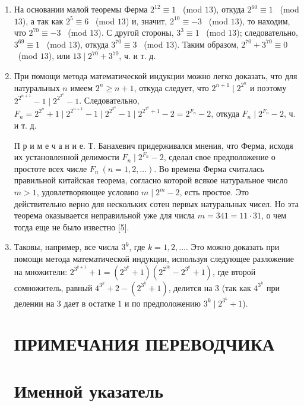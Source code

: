 \documentclass[12pt, a4paper, openany]{book}
\begin{document}
\begin{enumerate}
	\item На основании малой теоремы Ферма $2^{12}\equiv1$ \ (mod $13$), откуда $2^{60}\equiv1$ \ (mod $13$), а так как $2^{5}\equiv6$ \ (mod $13$) и, значит, $2^{10}\equiv-3$ \ (mod $13$), то находим, что $2^{70}\equiv-3$ \ (mod $13$). С другой стороны, $3^{3}\equiv1$ \ (mod $13$); следовательно, $3^{69}\equiv1$ \ (mod $13$), откуда $3^{70}\equiv3$ \ (mod $13$). Таким образом, $2^{70} + 3^{70}\equiv0$ \ (mod $13$), или $13 \mid 2^{70} + 3^{70}$, ч. и т. д.
	\item При помощи метода математической индукции можно легко доказать, что для натуральных $n$ имеем $2^n \geqslant n+1$, откуда следует, что $2^{n+1} \mid 2^{2^n}$ и поэтому $2^{2^{n+1}}-1 \mid 2^{2^{2^n}}-1$. Следовательно, $F_n = 2^{2^n} + 1 \mid 2^{2^{n+1}}-1 \mid 2^{2^{2^n}}-1 \mid 2^{2^{2^n}+1}-2 = 2^{F_n}-2$, откуда $F_n \mid 2^{F_n}-2$, ч. и т. д.
	
{\footnotesize 	П р и м е ч а н и е. Т. Банахевич придерживался мнения, что Ферма, исходя их установленной делимости $F_n \mid 2^{F_n}-2$, сделал свое предположение о простоте всех числе $F_n \ (n=1,2,\dots)$. Во времена Ферма считалась правильной китайская теорема, согласно которой всякое натуральное число $m>1$, удовлетворяющее условию $m \mid 2^m-2$, есть простое. Это действительно верно для нескольких сотен первых натуральных чисел. Но эта теорема оказывается неправильной уже для числа $m=341=11 \cdot 31$, о чем тогда еще не было известно [5].}
\item Таковы, например, все числа $3^k$, где $k=1,2, \dots$. Это можно доказать при помощи метода математической индукции, используя следующее разложение на множители: $2^{3^{k+1}}+1=(2^{3^k}+1)(2^{2^{3k}}-2^{3^k}+1)$, где второй сомножитель, равный $4^{3^k}+2 - (2^{3^{k}}+1)$, делится на $3$ (так как $4^{3^k}$ при делении на $3$ дает в остатке $1$ и по предположению $3^k \mid 2^{3^k}+1$).

\newpage

\section[Примечания переводчика]{\center ПРИМЕЧАНИЯ ПЕРЕВОДЧИКА}	
\newpage

\section[Именной указатель]{\center Именной указатель}	
\printindex
	
\end{enumerate}
\end{document}
